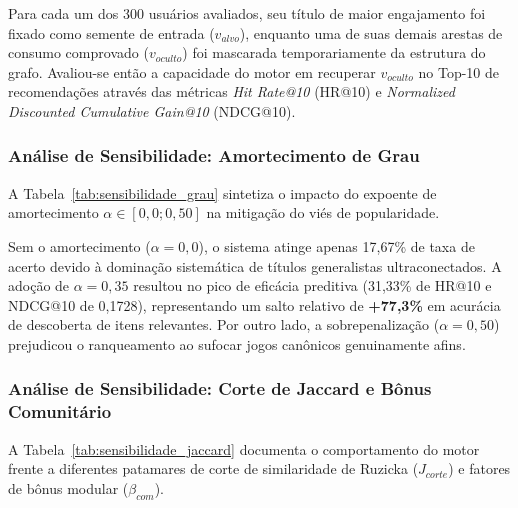 \documentclass[conference]{IEEEtran}
\begin{document}
Para cada um dos 300 usuários avaliados, seu título de maior engajamento foi fixado como semente de entrada ($v_{alvo}$), enquanto uma de suas demais arestas de consumo comprovado ($v_{oculto}$) foi mascarada temporariamente da estrutura do grafo. Avaliou-se então a capacidade do motor em recuperar $v_{oculto}$ no Top-10 de recomendações através das métricas \textit{Hit Rate@10} (HR@10) e \textit{Normalized Discounted Cumulative Gain@10} (NDCG@10).

\subsubsection{Análise de Sensibilidade: Amortecimento de Grau}
A Tabela~\ref{tab:sensibilidade_grau} sintetiza o impacto do expoente de amortecimento $\alpha \in [0{,}0; 0{,}50]$ na mitigação do viés de popularidade.

\begin{table}[htbp]
\caption{Sensibilidade ao Amortecimento Topológico de Grau ($\alpha$)}
\centering
{}
\label{tab:sensibilidade_grau}
\end{table}

Sem o amortecimento ($\alpha = 0{,}0$), o sistema atinge apenas 17,67\% de taxa de acerto devido à dominação sistemática de títulos generalistas ultraconectados. A adoção de $\alpha = 0{,}35$ resultou no pico de eficácia preditiva (31,33\% de HR@10 e NDCG@10 de 0,1728), representando um salto relativo de \textbf{+77,3\%} em acurácia de descoberta de itens relevantes. Por outro lado, a sobrepenalização ($\alpha = 0{,}50$) prejudicou o ranqueamento ao sufocar jogos canônicos genuinamente afins.

\subsubsection{Análise de Sensibilidade: Corte de Jaccard e Bônus Comunitário}
A Tabela~\ref{tab:sensibilidade_jaccard} documenta o comportamento do motor frente a diferentes patamares de corte de similaridade de Ruzicka ($J_{corte}$) e fatores de bônus modular ($\beta_{com}$).
\end{document}
